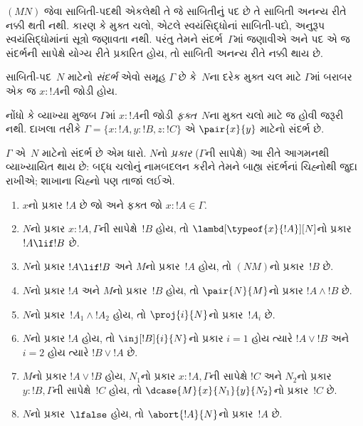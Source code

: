 \label{guunit:OLP-0697}


$(MN)$ જેવા સાબિતી-પદથી એકલેથી તે જે સાબિતીનું પદ છે
તે સાબિતી અનન્ય રીતે નક્કી થતી નથી.
કારણ કે મુક્ત ચલો, એટલે સ્વયંસિદ્ધોનાં સાબિતી-પદો,
અનુરૂપ સ્વયંસિદ્ધોમાંનાં સૂત્રો જણાવતા નથી.
પરંતુ તેમને સંદર્ભ~$\Gamma$માં જણાવીએ અને પદ એ જ સંદર્ભની સાપેક્ષે યોગ્ય રીતે
પ્રકારિત હોય, તો સાબિતી અનન્ય રીતે નક્કી થાય છે.

\begin{defn}
સાબિતી-પદ~$N$ માટેનો \emph{સંદર્ભ} એવો સમૂહ $\Gamma$ છે
કે~$N$ના દરેક મુક્ત ચલ માટે
$\Gamma$માં બરાબર એક જ $x : !A$ની જોડી હોય.
\end{defn}

નોંધો કે વ્યાખ્યા મુજબ $\Gamma$માં
$x:!A$ની જોડી \emph{ફક્ત}~$N$ના મુક્ત ચલો માટે જ
હોવી જરૂરી નથી.
દાખલા તરીકે $\Gamma = \{x:!A, y:!B, z:!C\}$
એ $\pair{x}{y}$ માટેનો સંદર્ભ છે.

\begin{defn}
  $\Gamma$ એ~$N$ માટેનો સંદર્ભ છે એમ ધારો.
  $N$નો \emph{પ્રકાર} ($\Gamma$ની સાપેક્ષે)
  આ રીતે આગમનથી વ્યાખ્યાયિત થાય છે:
  બદ્ધ ચલોનું નામબદલન કરીને તેમને બાહ્ય સંદર્ભનાં
  ચિહ્નોથી જુદા રાખીએ; શાખાના ચિહ્નો પણ તાજાં લઈએ.
  \begin{enumerate}
  \item $x$નો પ્રકાર $!A$ છે જો અને ફક્ત જો $x:!A \in \Gamma$.
  \item $N$નો પ્રકાર $x:!A, \Gamma$ની સાપેક્ષે~$!B$ હોય,
    તો $\lambd[\typeof{x}{!A}][N]$નો પ્રકાર $!A \lif !B$ છે.
  \item $N$નો પ્રકાર $!A \lif !B$ અને $M$નો પ્રકાર~$!A$ હોય,
    તો $(NM)$નો પ્રકાર~$!B$ છે.
  \item $N$નો પ્રકાર $!A$ અને $M$નો પ્રકાર~$!B$ હોય,
    તો $\pair{N}{M}$નો પ્રકાર $!A \land !B$ છે.
  \item $N$નો પ્રકાર~$!A_1 \land !A_2$ હોય,
    તો $\proj{i}{N}$નો પ્રકાર~$!A_i$ છે.
  \item $N$નો પ્રકાર $!A$ હોય, તો
    $\inj[!B]{i}{N}$નો પ્રકાર $i=1$ હોય ત્યારે $!A \lor !B$
    અને $i=2$ હોય ત્યારે $!B \lor !A$ છે.
  \item $M$નો પ્રકાર $!A \lor !B$ હોય,
    $N_1$નો પ્રકાર $x:!A, \Gamma$ની સાપેક્ષે $!C$
    અને $N_2$નો પ્રકાર $y:!B, \Gamma$ની સાપેક્ષે~$!C$ હોય,
    તો $\dcase{M}{x}{N_1}{y}{N_2}$નો પ્રકાર~$!C$ છે.
  \item $N$નો પ્રકાર~$\lfalse$ હોય,
    તો $\abort{!A}{N}$નો પ્રકાર~$!A$ છે.
  \end{enumerate}
\end{defn}


